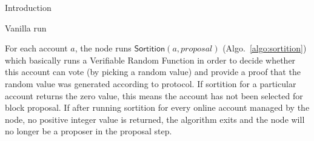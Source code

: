 \documentclass[10pt,a4paper]{article}
\begin{document}
\begin{section}{Introduction}
\begin{subsection}{Vanilla run}

%

For each account $a$, the node runs $\mathsf{Sortition}(a, proposal)$ (Algo.~\ref{algo:sortition}) 
which basically runs a Verifiable Random Function in order to decide whether this account 
can vote (by picking a random value) and provide a proof that the random value was generated according
to protocol.
If sortition for a particular account returns the zero value, this means the account has
not been selected for block proposal. %
If after running sortition for every online account managed by the node, no positive integer value is returned,
the algorithm exits and the node will no longer be a proposer in the proposal step.

\end{subsection}
\end{section}
\end{document}
